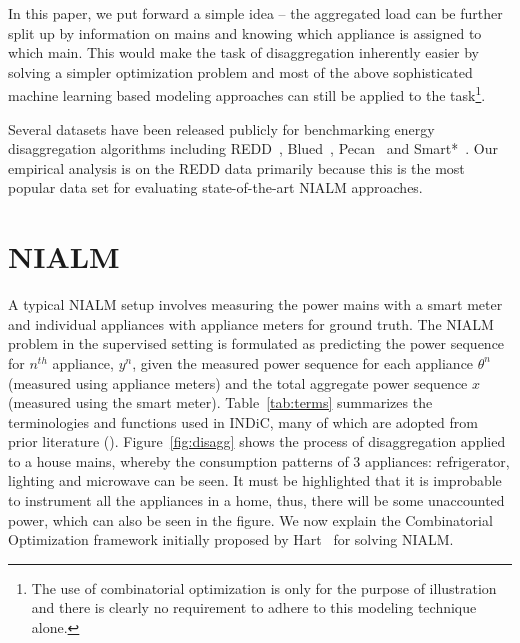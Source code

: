 \documentclass[conference]{IEEEtran}
\newcommand{\figref}[1]{Figure~\ref{#1}}
\newcommand{\tabref}[1]{Table~\ref{#1}}
\newcommand{\indicns}{INDiC}
\begin{document}
\noindent In this paper, we put forward a simple idea -- the aggregated load can be further split up by information on mains and knowing which appliance is assigned to which main. This would make the task of disaggregation inherently easier by solving a simpler optimization problem and most of the above sophisticated machine learning based modeling approaches can still be applied to the task\footnote{The use of combinatorial optimization is only for the purpose of illustration and there is clearly no requirement to adhere to this modeling technique alone.}. 

\noindent Several datasets have been released publicly for benchmarking energy disaggregation algorithms including REDD~\cite{redd}, Blued~\cite{blued_cmu}, Pecan~\cite{pecan} and Smart*~\cite{smart}. Our empirical analysis is on the REDD data primarily because this is the most popular data set for evaluating state-of-the-art NIALM approaches. 

\vspace{-2mm}
\section{NIALM}
\vspace{-1mm}
\noindent A typical NIALM setup involves measuring the power mains with a smart meter and individual appliances with appliance meters for ground truth. The NIALM problem in the supervised setting is formulated as predicting the power sequence for $n^{th}$ appliance, $y^n$, given the measured power sequence for each appliance $\theta^n$ (measured using appliance meters) and the total aggregate power sequence $x$ (measured using the smart meter). \tabref{tab:terms} summarizes the terminologies and functions used in \indicns, many of which are adopted from prior literature (\cite{redd,parson2012_aaai,hart}). \figref{fig:disagg} shows the process of disaggregation applied to a house mains, whereby the consumption patterns of 3 appliances: refrigerator, lighting and microwave can be seen. It must be highlighted that it is improbable to instrument all the appliances in a home, thus, there will be some unaccounted power, which can also be seen in the figure. We now explain the Combinatorial Optimization framework initially proposed by Hart~\cite{hart} for solving NIALM.
\end{document}
